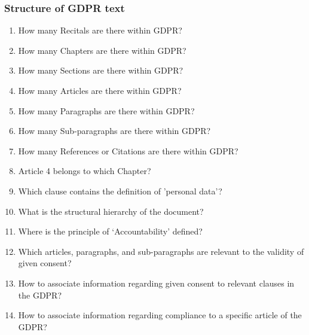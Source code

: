 \subsubsection{Structure of GDPR text}
\begin{enumerate}[label={\textit{CQ.\theenumi}}]
    \item How many Recitals are there within GDPR?
    \item How many Chapters are there within GDPR?
    \item How many Sections are there within GDPR?
    \item How many Articles are there within GDPR?
    \item How many Paragraphs are there within GDPR?
    \item How many Sub-paragraphs are there within GDPR?
    \item How many References or Citations are there within GDPR?
    \item Article 4 belongs to which Chapter?
    \item Which clause contains the definition of 'personal data'?
    \item What is the structural hierarchy of the document?
    \item Where is the principle of `Accountability' defined?
    \item Which articles, paragraphs, and sub-paragraphs are relevant to the validity of given consent?
    \item How to associate information regarding given consent to relevant clauses in the GDPR?
    \item How to associate information regarding compliance to a specific article of the GDPR?
\end{enumerate}

